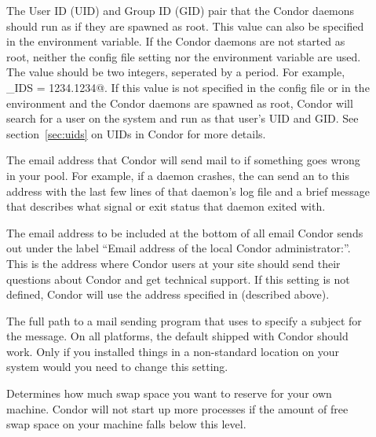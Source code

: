 \begin{description}
\item[] \label{param:CondorIds}
  The User ID (UID) and Group ID (GID) pair that the Condor daemons
  should run as if they are spawned as root.
  This value can also be specified in the 
  environment variable.
  If the Condor daemons are not started as root, neither the
   config file setting nor the 
  environment variable are used.
  The value should be two integers, seperated by a period.  For
  example, \verb@CONDOR_IDS = 1234.1234@.
  If this value is not specified in the config file or in the
  environment and the Condor daemons are spawned as root, Condor will
  search for a \verb@condor@ user on the system and run as that user's
  UID and GID.
  See section~\ref{sec:uids} on UIDs in Condor for more details.

\item[] \label{param:CondorAdmin} The email
  address that Condor will send mail to if something goes wrong in
  your pool.  For example, if a daemon crashes, the 
  can send an  to this address with the last few lines
  of that daemon's log file and a brief message that describes what
  signal or exit status that daemon exited with.
  
\item[] \label{param:CondorSupportEmail}
  The email address to be included at the bottom of all email Condor
  sends out under the label ``Email address of the local Condor
  administrator:''.  
  This is the address where Condor users at your site should send
  their questions about Condor and get technical support.
  If this setting is not defined, Condor will use the address
  specified in  (described above).

\item[] \label{param:Mail} The full path to a mail
  sending program that uses  to
  specify a subject for the message.  On all platforms,
  the default shipped with Condor should work.  Only if you
  installed things in a non-standard location on your system would you
  need to change this setting.
  
\item[] \label{param:ReservedSwap} Determines
  how much swap space you want to reserve for your own
  machine.  Condor will not start up more  processes if
  the amount of free swap space on your machine falls below this
  level. 


\end{description}

